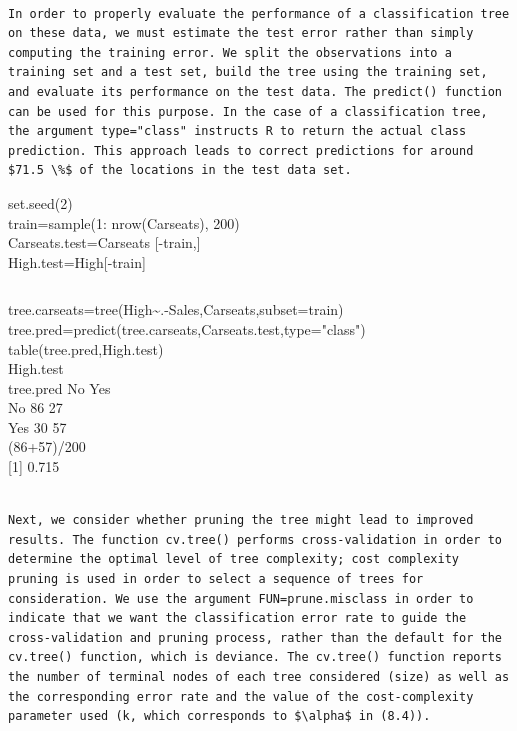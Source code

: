\documentclass[10pt]{article}
\begin{document}
\begin{verbatim}

In order to properly evaluate the performance of a classification tree on these data, we must estimate the test error rather than simply computing the training error. We split the observations into a training set and a test set, build the tree using the training set, and evaluate its performance on the test data. The predict() function can be used for this purpose. In the case of a classification tree, the argument type="class" instructs R to return the actual class prediction. This approach leads to correct predictions for around $71.5 \%$ of the locations in the test data set.
\end{verbatim}

\begin{displayquote}
set.seed(2)\\
train=sample(1: nrow(Carseats), 200)\\[0pt]
Carseats.test=Carseats [-train,]\\[0pt]
High.test=High[-train]
\end{displayquote}

\begin{verbatim}

\end{verbatim}

\begin{displayquote}
tree.carseats=tree(High\~{}.-Sales,Carseats,subset=train)\\
tree.pred=predict(tree.carseats,Carseats.test,type="class")\\
table(tree.pred,High.test)\\
High.test\\
tree.pred No Yes\\
No 86 27\\
Yes 30 57\\
(86+57)/200\\[0pt]
[1] 0.715
\end{displayquote}

\begin{verbatim}

Next, we consider whether pruning the tree might lead to improved results. The function cv.tree() performs cross-validation in order to determine the optimal level of tree complexity; cost complexity pruning is used in order to select a sequence of trees for consideration. We use the argument FUN=prune.misclass in order to indicate that we want the classification error rate to guide the cross-validation and pruning process, rather than the default for the cv.tree() function, which is deviance. The cv.tree() function reports the number of terminal nodes of each tree considered (size) as well as the corresponding error rate and the value of the cost-complexity parameter used (k, which corresponds to $\alpha$ in (8.4)).
\end{verbatim}
\end{document}
